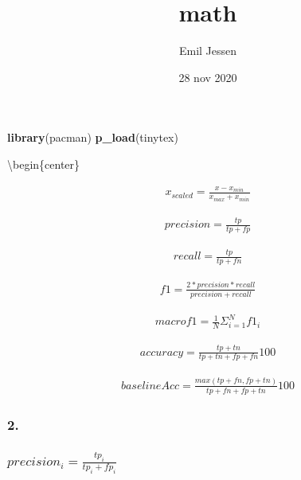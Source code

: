 \documentclass[]{article}
\title{math}
\author{Emil Jessen}
\date{28 nov 2020}
\newenvironment{Shaded}{\begin{snugshade}}{\end{snugshade}}
\newcommand{\KeywordTok}[1]{\textcolor[rgb]{0.13,0.29,0.53}{\textbf{#1}}}
\newcommand{\NormalTok}[1]{#1}
\begin{document}
\maketitle

\begin{Shaded}
\begin{Highlighting}[]
\KeywordTok{library}\NormalTok{(pacman)}
\KeywordTok{p_load}\NormalTok{(tinytex)}
\end{Highlighting}
\end{Shaded}

\textbackslash{}begin\{center\}

\[\begin{aligned}
x_{scaled} = \frac{x-x_{min}} {x_{max} + x_{min}}
\end{aligned}\]

\[\begin{aligned}
precision = \frac{tp} {tp + fp}
\end{aligned}\]

\[\begin{aligned}
recall = \frac{tp} {tp + fn}
\end{aligned}\]

\[\begin{aligned}
f1 = \frac{2 * precision * recall} {precision + recall}
\end{aligned}\]

\[\begin{aligned}
macro  f1 = \frac{1} {N}\Sigma^N_{i=1}f1_i
\end{aligned}\]

\[\begin{aligned}
accuracy = \frac{tp + tn} {tp + tn + fp + fn}100
\end{aligned}\]

\[\begin{aligned}
baseline Acc = \frac{max(tp + fn, fp + tn)} {tp + fn + fp + tn}100
\end{aligned}\]

\subsubsection{2.}\label{section}

\subsubsection{\texorpdfstring{\(precision_i = \frac{tp_i} {tp_i + fp_i}\)}{precision\_i = \textbackslash{}frac\{tp\_i\} \{tp\_i + fp\_i\}}}\label{precision_i-fractp_i-tp_i-fp_i}
\end{document}
